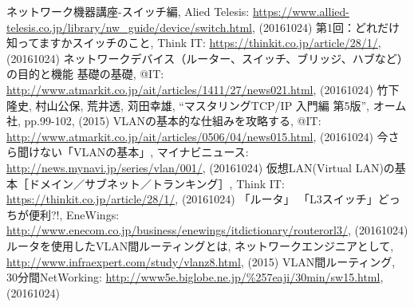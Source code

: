 \documentclass{jsarticle}
\begin{document}
\begin{thebibliography}{1}
  ネットワーク機器講座-スイッチ編, Alied Telesis: \url{https://www.allied-telesis.co.jp/library/nw_guide/device/switch.html}, (20161024)
  第1回：どれだけ知ってますかスイッチのこと, Think IT: \url{https://thinkit.co.jp/article/28/1/}, (20161024)
  ネットワークデバイス（ルーター、スイッチ、ブリッジ、ハブなど）の目的と機能 基礎の基礎, @IT:  \url{http://www.atmarkit.co.jp/ait/articles/1411/27/news021.html}, (20161024)
  竹下隆史, 村山公保, 荒井透, 苅田幸雄, ``マスタリングTCP/IP 入門編 第5版'', オーム社, pp.99-102, (2015) 
  VLANの基本的な仕組みを攻略する, @IT: \url{http://www.atmarkit.co.jp/ait/articles/0506/04/news015.html}, 
 		(20161024)
  今さら聞けない「VLANの基本」,  マイナビニュース: \url{http://news.mynavi.jp/series/vlan/001/}, (20161024)
  仮想LAN(Virtual LAN)の基本［ドメイン／サブネット／トランキング］, Think IT: 
 				\url{https://thinkit.co.jp/article/28/1/}, (20161024)
  「ルータ」 「L3スイッチ」どっちが便利?!, EneWings:  \url{http://www.enecom.co.jp/business/enewings/itdictionary/routerorl3/}, (20161024)
  ルータを使用したVLAN間ルーティングとは, ネットワークエンジニアとして, \url{http://www.infraexpert.com/study/vlanz8.html}, (2015) 
  VLAN間ルーティング, 30分間NetWorking: \url{http://www5e.biglobe.ne.jp/\%257eaji/30min/sw15.html}, 
 		(20161024)
 		
 
\end{thebibliography}
\end{document}

